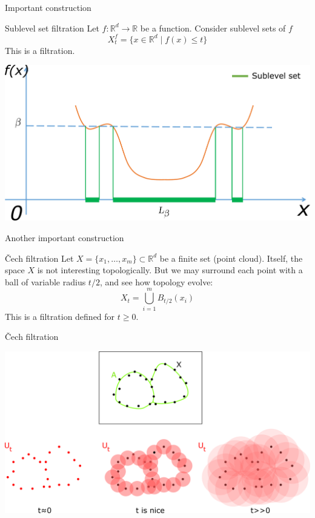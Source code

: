 \documentclass[10pt,xcolor={usenames}]{beamer}
\newcommand{\Ro}{\mathbb{R}}
\begin{document}
\begin{frame}{Important construction}

\begin{block}{Sublevel set filtration}
Let $f\colon \Ro^d\to \Ro$ be a function. Consider sublevel sets of $f$
\[
X^f_t=\{x\in \Ro^d\mid f(x)\leqslant t\}
\]
This is a filtration.
\end{block}

\begin{center}
  \includegraphics[scale = 0.13]{pictures/sublevel.pdf}
\end{center}

\end{frame}

\begin{frame}{Another important construction}

\begin{block}{\v{C}ech filtration}
Let $X=\{x_1,\ldots,x_m\}\subset \Ro^d$ be a finite set (point cloud). Itself, the space $X$ is not interesting topologically. But we may surround each point with a ball of variable radius $t/2$, and see how topology evolve:
\[
X_t=\bigcup_{i=1}^m B_{t/2}(x_i)
\]
This is a filtration defined for $t\geqslant 0$.
\end{block}

\end{frame}

\begin{frame}{\v{C}ech filtration}

\begin{center}
  \includegraphics[scale = 0.14]{pictures/sampling.pdf}
\end{center}

\end{frame}
\end{document}
